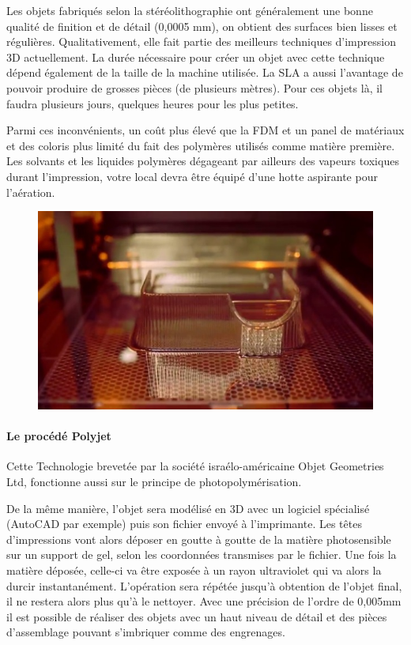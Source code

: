 \documentclass{article}
\begin{document}
Les objets fabriqués selon la stéréolithographie ont généralement une bonne qualité de finition et de détail (0,0005 mm), on obtient des surfaces bien lisses et régulières. Qualitativement, elle fait partie des meilleurs techniques d'impression 3D actuellement. La durée nécessaire pour créer un objet avec cette technique dépend également de la taille de la machine utilisée. La SLA a aussi l'avantage de pouvoir produire de grosses pièces (de plusieurs mètres). Pour ces objets là, il faudra plusieurs jours, quelques heures pour les plus petites.\hfill

Parmi ces inconvénients, un coût plus élevé que la FDM et un panel de matériaux et des coloris plus limité du fait des polymères utilisés comme matière première. Les solvants et les liquides polymères dégageant par ailleurs des vapeurs toxiques durant l'impression, votre local devra être équipé d'une hotte aspirante pour l'aération.
\begin{figure}[h!]
\centering
\includegraphics[scale=0.4]{./images/impression-sla.png}
\end{figure}
\newpage
\paragraph{Le procédé Polyjet} \hfill

Cette Technologie brevetée par la société israélo-américaine Objet Geometries Ltd, fonctionne aussi sur le principe de photopolymérisation.\hfill

De la même manière, l'objet sera modélisé en 3D avec un logiciel spécialisé (AutoCAD par exemple) puis son fichier envoyé à l'imprimante. Les têtes d'impressions vont alors déposer en goutte à goutte de la matière photosensible sur un support de gel, selon les coordonnées transmises par le fichier. Une fois la matière déposée, celle-ci va être exposée à un rayon ultraviolet qui va alors la durcir instantanément. L'opération sera répétée jusqu'à obtention de l'objet final, il ne restera alors plus qu'à le nettoyer. Avec une précision de l'ordre de 0,005mm il est possible de réaliser des objets avec un haut niveau de détail et des pièces d'assemblage pouvant s'imbriquer comme des engrenages.\hfill
\end{document}
